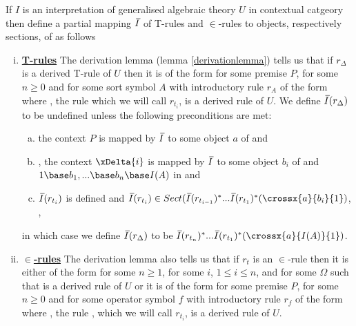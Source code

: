 \newpage
\begin{definition} 
If $I$ is an interpretation of generalised algebraic theory $U$ in contextual catgeory \catcw
then define a
partial mapping $\Ibar$  of T-rules and $\in$-rules to objects, respectively sections, of \catcw
as follows
\begin{enumerate}[(i)] 
\item \underline{\textbf{T-rules}} 
The derivation lemma (lemma \ref{derivationlemma}) tells us that if $r_\Delta$ is a derived T-rule of $U$  then it is of the form  for some premise $P$, for some $n \geq 0$ and for some sort symbol $A$ with introductory rule $r_A$ of the form  where \foreachi, the rule 
 which we will call $r_{t_i}$, is a derived rule of $U$. 
We define $\Ibar(r_\Delta)$ to be undefined unless the following preconditions are met:
\begin{enumerate}[(a)]
\item
the context  $P$ is mapped by $\Ibar$ to some object $a$ of \catcw and 
\item
\foreachi, the context $\xDelta{i}$ is mapped by $\Ibar$ to some object $b_i$ of \catcw
and $1 \base b_1,...\base b_n \base I(A)$ in \catcw and
\item
$\Ibar(r_{t_i})$ is defined and $\Ibar(r_{t_i}) \in Sect(\Ibar(r_{t_{i-1}})^*...\Ibar(r_{t_1})^*(\crossx{a}{b_i}{1})$, \foreachi,
\end{enumerate}
in which case we define $\Ibar(r_\Delta)$ to be $\Ibar(r_{t_n})^*...\Ibar(r_{t_1})^*(\crossx{a}{I(A)}{1})$. 
\item \underline{\textbf{$\boldsymbol {\in}$-rules}} 
The derivation lemma also tells us that if $r_t$ is an $\in$-rule then it is  
either  of the form  for some $n \ge 1$, for some $i$, $1 \leq i \leq n$, 
and for some $\Omega$ such that  is a derived rule of $U$
or  it is of the form  for some premise $P$, for some $n \geq 0$ and for some operator symbol $f$ with introductory rule $r_f$ of the form  where \foreachi, the rule 
, which we will call $r_{t_i}$, is a derived rule of $U$. 


\end{enumerate}
\end{definition}
